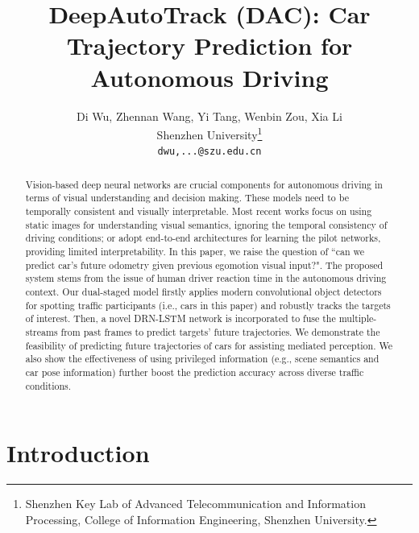 \documentclass[10pt,twocolumn,letterpaper]{article}
\begin{document}
\title{DeepAutoTrack (DAC): Car Trajectory Prediction for Autonomous Driving}

\author{Di Wu, Zhennan Wang, Yi Tang,  Wenbin Zou, Xia Li\\
Shenzhen University\thanks{Shenzhen Key Lab of Advanced Telecommunication and Information Processing, College of Information Engineering, Shenzhen University.}\\
{\tt\small dwu,...@szu.edu.cn}}
\maketitle
\begin{abstract}

Vision-based deep neural networks are crucial components for autonomous driving in terms of visual understanding and decision making.
These models need to be temporally consistent and visually interpretable.
Most recent works focus on using static images for understanding visual semantics, ignoring the temporal consistency of driving conditions; or adopt end-to-end architectures for learning the pilot networks, providing limited interpretability.
In this paper, we raise the question of ``can we predict car's future odometry given previous egomotion visual input?".
The proposed system stems from the issue of human driver reaction time in the autonomous driving context.
Our dual-staged model firstly applies modern convolutional object detectors for spotting traffic participants (i.e., cars in this paper) and robustly tracks the targets of interest.
Then, a novel DRN-LSTM network is incorporated to fuse the multiple-streams from past frames to predict targets' future trajectories.
We demonstrate the feasibility of predicting future trajectories of cars for assisting mediated perception.
 We also show the effectiveness of using privileged information (e.g., scene semantics and car pose information) further boost the prediction accuracy across diverse traffic conditions.
\end{abstract}
\section{Introduction}
\end{document}
